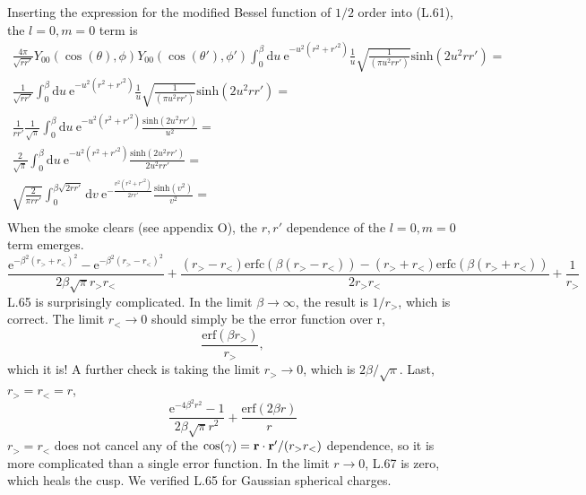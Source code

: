 \documentclass[paper=a4, fontsize=11pt]{article} %
\numberwithin{equation}{section} %
\numberwithin{figure}{section} %
\numberwithin{table}{section} %
\newcommand{\br}{{\bf{r}}}
\newcommand{\re}{{\mathrm{e}}}
\newcommand{\rerf}{{\mathrm{erf}}}
\newcommand{\rerfc}{{\mathrm{erfc}}}
\newcommand{\rd}{{\mathrm{d}}}
\begin{document}
Inserting the expression for the modified Bessel function of $1/2$ order into (L.61), the $l=0, m=0$ term is
\begin{equation}
\begin{split}
\frac{4\pi}{\sqrt{r r'}} Y_{00}\left(\cos(\theta),\phi\right)Y_{00}\left(\cos(\theta'),\phi'\right) \int_{0}^\beta \rd u\ \re^{-u^2(r^2 + r'^2)} \frac{1}{u}\sqrt{\frac{1}{(\pi u^2 r r')}} \mathrm{sinh}(2 u^2 r r') =\\
\frac{1}{\sqrt{r r'}} \int_{0}^\beta \rd u\ \re^{-u^2(r^2 + r'^2)} \frac{1}{u}\sqrt{\frac{1}{(\pi u^2 r r')}} \mathrm{sinh}(2 u^2 r r') =\\
\frac{1}{r r'} \frac{1}{\sqrt{\pi}} \int_{0}^\beta \rd u\ \re^{-u^2(r^2 + r'^2)} \frac{\mathrm{sinh}(2 u^2 r r')}{u^2}  =\\
\frac{2}{\sqrt{\pi}} \int_{0}^\beta \rd u\ \re^{-u^2(r^2 + r'^2)} \frac{\mathrm{sinh}(2 u^2 r r')}{2u^2 r r'}  =\\
\sqrt{\frac{2}{\pi r r'}} \int_{0}^{\beta\sqrt{2r r'}} \rd v\ \re^{-\frac{v^2(r^2 + r'^2)}{2r r'}} \frac{\mathrm{sinh}(v^2)}{v^2}  =\\
\end{split}
\end{equation}
When the smoke clears (see appendix O), the $r, r'$ dependence of the $l=0, m=0$ term emerges.
\begin{equation}
\frac{\re^{-\beta^2(r_>+r_<)^2 }-\re^{-\beta^2(r_>-r_<)^2 }}{2\beta \sqrt{\pi}r_> r_< } + \frac{(r_> - r_<)\rerfc\left(\beta(r_> - r_<)\right) - (r_> + r_<)\rerfc\left(\beta(r_> + r_<)\right)}{2 r_>r_<} + \frac{1}{r_>}
\end{equation}
L.65 is surprisingly complicated. In the limit $\beta \rightarrow \infty$, the result is $1/r_>$, which is correct. The limit $r_< \rightarrow 0$ should simply be the error function over r,
\begin{equation}
\frac{\rerf(\beta r_>)}{r_>},
\end{equation}
which it is! A further check is taking the limit $r_> \rightarrow 0$, which is $2\beta/\sqrt{\pi}$. Last, $r_> = r_< = r$, 
\begin{equation}
\frac{\re^{-4\beta^2r^2} - 1}{2\beta\sqrt{\pi}r^2} + \frac{\rerf\left(2\beta r\right)}{r}
\end{equation}
$r_> = r_< $ does not cancel any of the $\cos(\gamma) = \br \cdot \br'/(r_> r_<)$ dependence, so it is more complicated than a single error function. In the limit $r \rightarrow 0$, L.67 is zero, which heals the cusp. We verified L.65 for Gaussian spherical charges.
\end{document}
